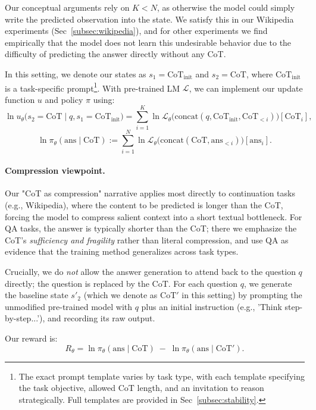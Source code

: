 \documentclass{article} %
\begin{document}
Our conceptual arguments rely on $K < N$, as otherwise the model could simply write the predicted observation into the state. We satisfy this in our Wikipedia experiments (Sec~\ref{subsec:wikipedia}), and for other experiments we find empirically that the model does not learn this undesirable behavior due to the difficulty of predicting the answer directly without any CoT.

In this setting, we denote our states as $s_1 = \text{CoT}_{\text{init}}$ and $s_2 = \text{CoT}$, where $\text{CoT}_{\text{init}}$ is a task-specific prompt\footnote{The exact prompt template varies by task type, with each template specifying the task objective, allowed $\text{CoT}$ length, and an invitation to reason strategically. Full templates are provided in Sec~\ref{subsec:stability}.}. With pre-trained LM $\mathcal{L}$, we can implement our update function $u$ and policy $\pi$ using:
\[\ln u_\theta\!\bigl(s_2=\text{CoT}\mid q, s_1=\text{CoT}_{\text{init}}\bigr)
= \sum_{i=1}^{K} \ln \mathcal{L}_\theta\!\bigl(\text{concat}(q,\text{CoT}_{\text{init}},\text{CoT}_{<i})\bigr)[\text{CoT}_i], \]
\[\ln \pi_\theta(\text{ans}\mid \text{CoT})
:= \sum_{i=1}^{N} \ln \mathcal{L}_\theta\!\bigl(\text{concat}(\text{CoT},\text{ans}_{<i})\bigr)[\text{ans}_i].\]

\paragraph{Compression viewpoint.} Our "CoT as compression" narrative applies most directly to continuation tasks (e.g., Wikipedia), where the content to be predicted is longer than the CoT, forcing the model to compress salient context into a short textual bottleneck. For QA tasks, the answer is typically shorter than the CoT; there we emphasize the CoT's \emph{sufficiency and fragility} rather than literal compression, and use QA as evidence that the training method generalizes across task types.

Crucially, we do \emph{not} allow the answer generation to attend back to the question $q$ directly; the question is replaced by the $\text{CoT}$. For each question $q$, we generate the baseline state $s'_2$ (which we denote as $\text{CoT}'$ in this setting) by prompting the unmodified pre-trained model with $q$ plus an initial instruction (e.g., 'Think step-by-step...'), and recording its raw output.

Our reward is:
$$
R_\theta = \ln \pi_\theta(\text{ans} \mid \text{CoT}) \;-\; \ln \pi_\theta(\text{ans} \mid \text{CoT}').
$$
\end{document}

